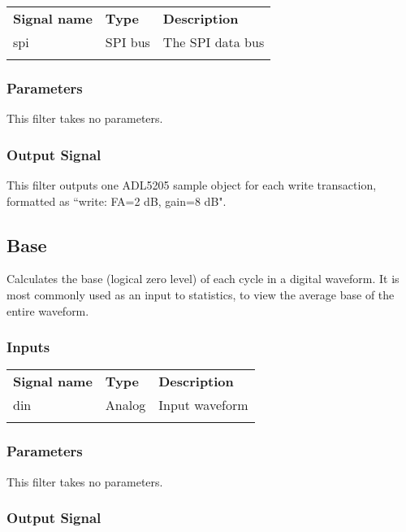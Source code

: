 \begin{tabularx}{16cm}{llX}
\thickhline
\textbf{Signal name} & \textbf{Type} & \textbf{Description} \\
\thickhline
spi & SPI bus & The SPI data bus \\
\thickhline
\end{tabularx}

\subsubsection{Parameters}

This filter takes no parameters.

\subsubsection{Output Signal}

This filter outputs one ADL5205 sample object for each write transaction, formatted as ``write: FA=2 dB, gain=8 dB".

\pagebreak
\subsection{Base}

Calculates the base (logical zero level) of each cycle in a digital waveform. It is most commonly used as an input to
statistics, to view the average base of the entire waveform.

\subsubsection{Inputs}

\begin{tabularx}{16cm}{llX}
\thickhline
\textbf{Signal name} & \textbf{Type} & \textbf{Description} \\
\thickhline
din & Analog & Input waveform \\
\thickhline
\end{tabularx}

\subsubsection{Parameters}

This filter takes no parameters.

\subsubsection{Output Signal}

